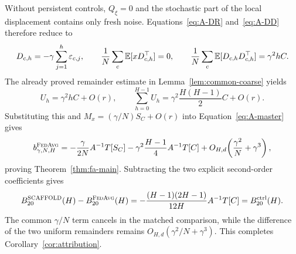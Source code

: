Without persistent controls, $Q_\xi=0$ and the stochastic part of the
local displacement contains only fresh noise. Equations~\eqref{eq:A-DR}
and~\eqref{eq:A-DD} therefore reduce to
\[
 D_{c,h}=-\gamma\sum_{j=1}^h\varepsilon_{c,j},\qquad
 \frac1N\sum_c\mathbb{E}[xD_{c,h}^\top]=0,\qquad
 \frac1N\sum_c\mathbb{E}[D_{c,h}D_{c,h}^\top]=\gamma^2hC.
\]
The already proved remainder estimate in Lemma~\ref{lem:common-coarse} yields
\begin{equation}
\label{eq:B-U}
 U_h=\gamma^2hC+O(r),\qquad
 \sum_{h=0}^{H-1}U_h=\gamma^2\frac{H(H-1)}2C+O(r).
\end{equation}
Substituting this and $M_x=(\gamma/N)S_C+O(r)$ into
Equation~\eqref{eq:A-master} gives
\begin{equation}
\label{eq:B-final-expansion}
 b^{\textnormal{\textsc{FedAvg}}}_{\gamma,N,H}
 =-\frac{\gamma}{2N}A^{-1}T[S_C]
 -\gamma^2\frac{H-1}{4}A^{-1}T[C]
 +O_{H,d}\!\left(\frac{\gamma^2}{N}+\gamma^3\right),
\end{equation}
proving Theorem~\ref{thm:fa-main}.
Subtracting the two explicit second-order coefficients gives
\[
 B_{20}^{\textnormal{\textsc{SCAFFOLD}}}(H)-B_{20}^{\textnormal{\textsc{FedAvg}}}(H)
 =-\frac{(H-1)(2H-1)}{12H}A^{-1}T[C]
 =B_{20}^{\mathrm{ctrl}}(H).
\]
The common $\gamma/N$ term cancels in the matched comparison, while
the difference of the two uniform remainders remains
$O_{H,d}(\gamma^2/N+\gamma^3)$. This completes
Corollary~\ref{cor:attribution}.
